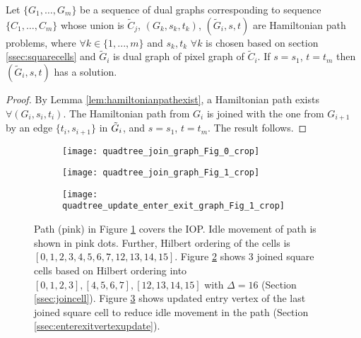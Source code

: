 \begin{lem}\label{lem:joinedgraphhamiltonianpathexist}
  Let $\{G_1, \dots, G_m\}$ be a sequence of dual graphs corresponding to sequence $\{C_1, \dots, C_m\}$ whose union is $\tilde{C}_j$, $(G_k, s_k, t_k)$, $(\tilde{G}_i, s, t)$ are Hamiltonian path problems, where $\forall k \in \{1, ... , m\}$ and $s_k, t_k$ $\forall k$ is chosen based on section \ref{ssec:squarecells} and $\tilde{G}_i$ is dual graph of pixel graph of $\tilde{C}_i$.
  If $s= s_1$, $t = t_m$ then $(\tilde{G}_i, s, t)$ has a solution.
\end{lem}
\begin{proof}
  By Lemma \ref{lem:hamiltonianpathexist}, a Hamiltonian path exists $\forall (G_i, s_i, t_i)$.
  The Hamiltonian path from $G_i$ is joined with the one from $G_{i+1}$ by an edge $\{t_i, s_{i+1}\}$ in $\tilde{G}_i$, and $s = s_1$, $t = t_m$.
  The result follows.
\end{proof}

\begin{figure}[htp!]
  \medskip
  \centering
  \begin{subfigure}[t]{1.8in}
    \texttt{[image: quadtree\_join\_graph\_Fig\_0\_crop]}
    \caption{\label{fig:quadtreejoina}}
  \end{subfigure}
  \begin{subfigure}[t]{1.8in}
    \texttt{[image: quadtree\_join\_graph\_Fig\_1\_crop]}
    \caption{\label{fig:quadtreejoinb}}
  \end{subfigure}
  \begin{subfigure}[t]{1.8in}
    \centering
    \texttt{[image: quadtree\_update\_enter\_exit\_graph\_Fig\_1\_crop]}
    \caption{\label{fig:quadtreejoinc}}
  \end{subfigure}
  \caption{\label{fig:quadtreejoin}
    Path (pink) in Figure \ref{fig:quadtreejoina} covers the IOP.
    Idle movement of path is shown in pink dots.
    Further, Hilbert ordering of the cells is $[0, 1, 2, 3, 4, 5, 6, 7, 12, 13, 14, 15]$.
    Figure \ref{fig:quadtreejoinb} shows $3$ joined square cells based on Hilbert ordering into $[0, 1, 2, 3], [4, 5, 6, 7], [12, 13, 14, 15]$ with $\Delta = 16$ (Section \ref{ssec:joincell}).
    Figure \ref{fig:quadtreejoinc} shows updated entry vertex of the last joined square cell to reduce idle movement in the path (Section \ref{ssec:enterexitvertexupdate}).
  }  	
\end{figure}

